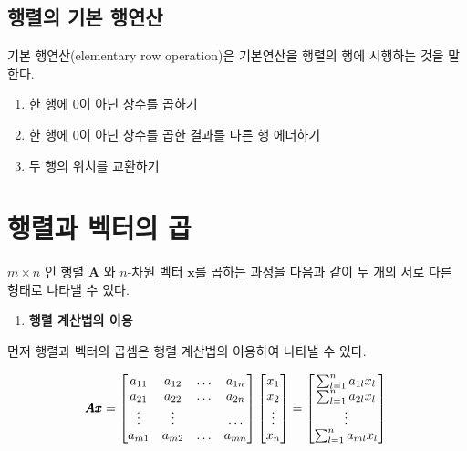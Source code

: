 \documentclass[
  11pt,
  a4paper,
  oneside]{scrbook}
\providecommand{\tightlist}{%
  \setlength{\itemsep}{0pt}\setlength{\parskip}{0pt}}\usepackage{longtable,booktabs,array}
\theoremstyle{definition}
\theoremstyle{definition}
\theoremstyle{plain}
\theoremstyle{remark}
\begin{document}
\subsection{행렬의 기본
행연산}\label{uxd589uxb82cuxc758-uxae30uxbcf8-uxd589uxc5f0uxc0b0}

기본 행연산(elementary row operation)은 기본연산을 행렬의 행에 시행하는
것을 말한다.

\begin{enumerate}
\def\labelenumi{\arabic{enumi}.}
\tightlist
\item
  한 행에 0이 아닌 상수를 곱하기
\item
  한 행에 0이 아닌 상수를 곱한 결과를 다른 행 에더하기
\item
  두 행의 위치를 교환하기
\end{enumerate}

\section{행렬과 벡터의 곱}\label{sec-intro-product}

\(m \times n\) 인 행렬 \(\pmb A\) 와 \(n\)-차원 벡터 \(\pmb x\)를 곱하는
과정을 다음과 같이 두 개의 서로 다른 형태로 나타낼 수 있다.

\begin{enumerate}
\def\labelenumi{\arabic{enumi}.}
\tightlist
\item
  \textbf{행렬 계산법의 이용}
\end{enumerate}

먼저 행렬과 벡터의 곱셈은 행렬 계산법의 이용하여 나타낼 수 있다.

\[
{\pmb A} {\pmb x}  = 
\begin{bmatrix}
a_{11} & a_{12} & \dots & a_{1n} \\
a_{21} & a_{22} & \dots & a_{2n} \\
\vdots & \vdots &    & \dots \\
a_{m1} & a_{m2} & \dots & a_{mn} 
\end{bmatrix}
\begin{bmatrix}
x_1 \\
x_2 \\
\vdots \\
x_n 
\end{bmatrix} 
=
\begin{bmatrix}
\sum_{l=1}^n a_{1l} x_l \\
\sum_{l=1}^n a_{2l} x_l \\
\vdots \\
\sum_{l=1}^n a_{ml} x_l
\end{bmatrix} \\
\]
\end{document}
